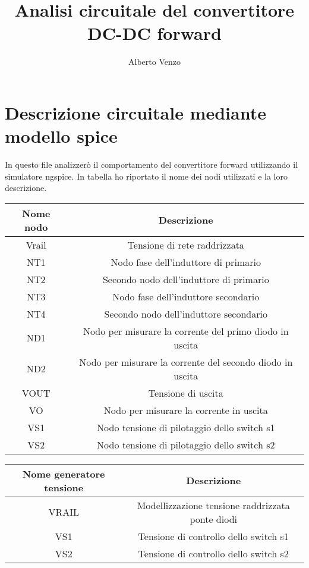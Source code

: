 \documentclass[11pt]{article} %
\title{Analisi circuitale del convertitore DC-DC forward}
\author{Alberto Venzo}
\begin{document}
\maketitle

\section{Descrizione circuitale mediante modello spice}

In questo file analizzer\`o il comportamento del convertitore forward utilizzando il simulatore ngspice. In tabella ho riportato il nome dei
nodi utilizzati e la loro descrizione.

\begin{table}[H]

\begin{tabular}{|c|c|}
\hline 
Nome nodo & Descrizione \\ 
\hline 
Vrail & Tensione di rete raddrizzata \\ 
\hline 
NT1 & Nodo fase dell'induttore di primario \\ 
\hline 
NT2 & Secondo nodo dell'induttore di primario \\ 
\hline 
NT3 & Nodo fase dell'induttore secondario \\ 
\hline 
NT4 & Secondo nodo dell'induttore secondario \\
\hline 
ND1 & Nodo per misurare la corrente del primo diodo in uscita \\ 
\hline 
ND2 & Nodo per misurare la corrente del secondo diodo in uscita \\ 
\hline 
VOUT & Tensione di uscita \\ 
\hline 
VO & Nodo per misurare la corrente in uscita \\ 
\hline
VS1 & Nodo tensione di pilotaggio dello switch s1 \\
\hline
VS2 & Nodo tensione di pilotaggio dello switch s2 \\
\hline
\end{tabular}

\end{table}

\begin{table}[H]
\begin{tabular}{|c|c|}
\hline 
Nome generatore tensione & Descrizione \\ 
\hline 
VRAIL & Modellizzazione tensione raddrizzata ponte diodi \\ 
\hline 
VS1 & Tensione di controllo dello switch s1 \\ 
\hline 
VS2 & Tensione di controllo dello switch s2 \\ 
\hline 
\end{tabular} 
\end{table}
\end{document}
